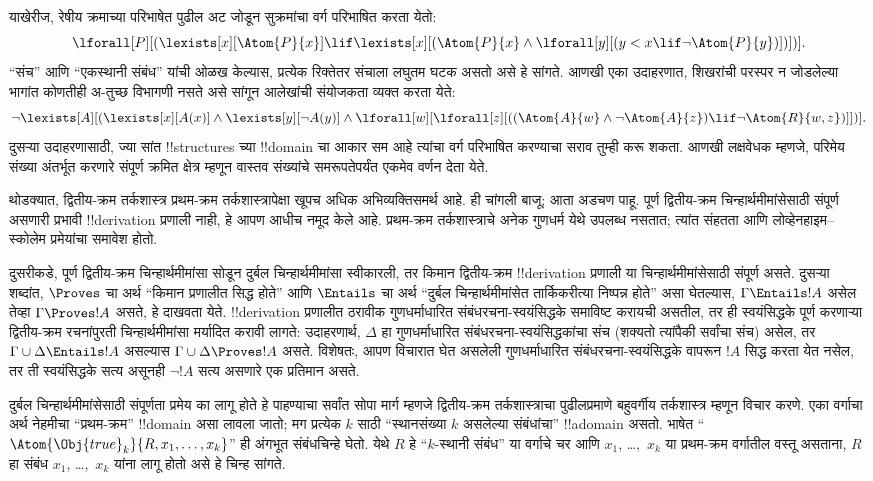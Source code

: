\documentclass[../../../include/open-logic-section]{subfiles}
\begin{document}
याखेरीज, रेषीय क्रमाच्या परिभाषेत पुढील अट जोडून सुक्रमांचा वर्ग परिभाषित
करता येतो:
\[
\lforall[P][(\lexists[x][\Atom{P}{x}] \lif \lexists[x][(\Atom{P}{x}
    \land \lforall[y][(y < x \lif \lnot \Atom{P}{y})])])].
\]
“संच” आणि “एकस्थानी संबंध” यांची ओळख केल्यास, प्रत्येक रिक्तेतर संचाला
लघुतम घटक असतो असे हे सांगते. आणखी एका उदाहरणात, शिखरांची परस्पर न जोडलेल्या
भागांत कोणतीही अ-तुच्छ विभागणी नसते असे सांगून आलेखांची संयोजकता व्यक्त करता
येते:
\[
\lnot \lexists[A][(\lexists[x][A(x)] \land \lexists[y][\lnot A(y)]
  \land \lforall[w][\lforall[z][((\Atom{A}{w} \land \lnot \Atom{A}{z})
      \lif \lnot \Atom{R}{w,z})]])].
\]
दुसऱ्या उदाहरणासाठी, ज्या सांत !!{structure}s च्या !!{domain} चा आकार सम
आहे त्यांचा वर्ग परिभाषित करण्याचा सराव तुम्ही करू शकता. आणखी लक्षवेधक
म्हणजे, परिमेय संख्या अंतर्भूत करणारे संपूर्ण क्रमित क्षेत्र म्हणून वास्तव
संख्यांचे समरूपतेपर्यंत एकमेव वर्णन देता येते.

थोडक्यात, द्वितीय-क्रम तर्कशास्त्र प्रथम-क्रम तर्कशास्त्रापेक्षा खूपच अधिक
अभिव्यक्तिसमर्थ आहे. ही चांगली बाजू; आता अडचण पाहू. पूर्ण द्वितीय-क्रम
चिन्हार्थमीमांसेसाठी संपूर्ण असणारी प्रभावी !!{derivation} प्रणाली नाही, हे
आपण आधीच नमूद केले आहे. प्रथम-क्रम तर्कशास्त्राचे अनेक गुणधर्म येथे उपलब्ध
नसतात; त्यांत संहतता आणि लोव्हेनहाइम--स्कोलेम प्रमेयांचा समावेश होतो.

दुसरीकडे, पूर्ण द्वितीय-क्रम चिन्हार्थमीमांसा सोडून दुर्बल चिन्हार्थमीमांसा
स्वीकारली, तर किमान द्वितीय-क्रम !!{derivation} प्रणाली या
चिन्हार्थमीमांसेसाठी संपूर्ण असते. दुसऱ्या शब्दांत, $\Proves$ चा अर्थ
“किमान प्रणालीत सिद्ध होते” आणि $\Entails$ चा अर्थ “दुर्बल
चिन्हार्थमीमांसेत तार्किकरीत्या निष्पन्न होते” असा घेतल्यास, $\Gamma \Entails
!A$ असेल तेव्हा $\Gamma \Proves !A$ असते, हे दाखवता येते.
!!{derivation} प्रणालीत ठरावीक गुणधर्माधारित संबंधरचना-स्वयंसिद्धके समाविष्ट
करायची असतील, तर ही स्वयंसिद्धके पूर्ण करणाऱ्या द्वितीय-क्रम रचनांपुरती
चिन्हार्थमीमांसा मर्यादित करावी लागते: उदाहरणार्थ, $\Delta$ हा
गुणधर्माधारित संबंधरचना-स्वयंसिद्धकांचा संच (शक्यतो त्यांपैकी सर्वांचा संच)
असेल, तर $\Gamma \cup \Delta \Entails !A$ असल्यास $\Gamma \cup \Delta
\Proves !A$ असते. विशेषतः, आपण विचारात घेत असलेली गुणधर्माधारित
संबंधरचना-स्वयंसिद्धके वापरून $!A$ सिद्ध करता येत नसेल, तर ती स्वयंसिद्धके
सत्य असूनही $\lnot !A$ सत्य असणारे एक प्रतिमान असते.

दुर्बल चिन्हार्थमीमांसेसाठी संपूर्णता प्रमेय का लागू होते हे पाहण्याचा सर्वांत
सोपा मार्ग म्हणजे द्वितीय-क्रम तर्कशास्त्राचा पुढीलप्रमाणे बहुवर्गीय
तर्कशास्त्र म्हणून विचार करणे. एका वर्गाचा अर्थ नेहमीचा “प्रथम-क्रम”
!!{domain} असा लावला जातो; मग प्रत्येक $k$ साठी “स्थानसंख्या $k$ असलेल्या
संबंधांचा” !!a{domain} असतो. भाषेत
“$\Atom{\Obj{true}_k}{R,x_1,\dots,x_k}$” ही अंगभूत संबंधचिन्हे घेतो. येथे
$R$ हे “$k$-स्थानी संबंध” या वर्गाचे चर आणि $x_1$, \dots,~$x_k$ या
प्रथम-क्रम वर्गातील वस्तू असताना, $R$ हा संबंध $x_1$, \dots,~$x_k$ यांना
लागू होतो असे हे चिन्ह सांगते.
\end{document}

